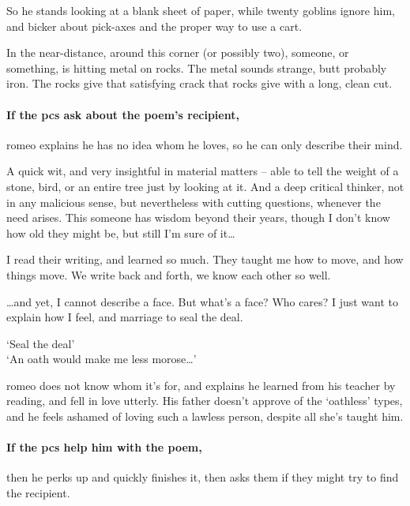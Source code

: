 \begin{multicols}{2}
So he stands looking at a blank sheet of paper, while twenty goblins ignore him, and bicker about pick-axes and the proper way to use a cart.

\begin{boxtext}
  In the near-distance, around this corner (or possibly two), someone, or something, is hitting metal on rocks.
  The metal sounds strange, butt probably iron.
  The rocks give that satisfying crack that rocks give with a long, clean cut.
\end{boxtext}

\paragraph{If the \glspl{pc} ask about the poem's recipient,}
\gls{romeo} explains he has no idea whom he loves, so he can only describe their mind.

\begin{speechtext}
  A quick wit, and very insightful in material matters -- able to tell the weight of a stone, bird, or an entire tree just by looking at it.
  And a deep critical thinker, not in any malicious sense, but nevertheless with cutting questions, whenever the need arises.
  This someone has wisdom beyond their years, though I don't know how old they might be, but still I'm sure of it\ldots

  I read their writing, and learned so much.
  They taught me how to move, and how things move.
  We write back and forth, we know each other so well.

  \ldots and yet, I cannot describe a face.
  But what's a face?
  Who cares?
  I just want to explain how I feel, and marriage to seal the deal.

  `Seal the deal'\\
  `An oath would make me less morose\ldots'

\end{speechtext}

\Gls{romeo} does not know whom it's for, and explains he learned from his teacher by reading, and fell in love utterly.
His father doesn't approve of the `oathless' types, and he feels ashamed of loving such a lawless person, despite all she's taught him.

\paragraph{If the \glspl{pc} help him with the poem,}
then he perks up and quickly finishes it, then asks them if they might try to find the recipient.


\end{multicols}

